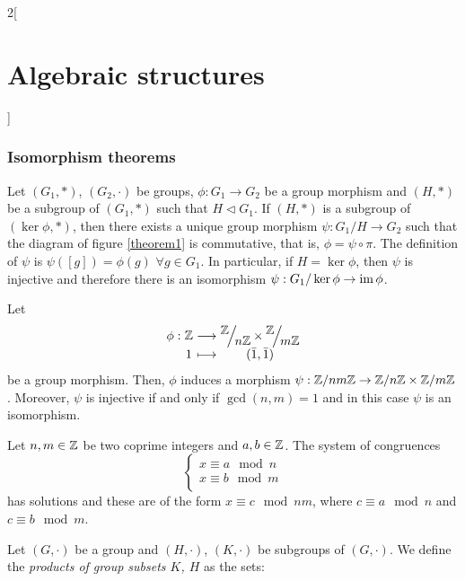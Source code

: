 \documentclass[../../../main.tex]{subfiles}
\begin{document}
\begin{multicols}{2}[\section{Algebraic structures}]
\subsubsection{Isomorphism theorems}
\begin{theorem}
    Let $(G_1,*)$, $(G_2,\cdot)$ be groups, $\phi:G_1\rightarrow G_2$ be a group morphism and $(H,*)$ be a subgroup of $(G_1,*)$ such that $H\lhd G_1$. If $(H,*)$ is a subgroup of $(\ker\phi,*)$, then there exists a unique group morphism $\psi:G_1/H\rightarrow G_2$ such that the diagram of figure \ref{theorem1} is commutative, that is, $\phi=\psi\circ\pi$.
    The definition of $\psi$ is $\psi([g])=\phi(g)$ $\forall g\in G_1$.
    In particular, if $H=\ker\phi$, then $\psi$ is injective and therefore there is an isomorphism $\psi:G_1/\ker\phi\rightarrow\operatorname{im}\phi$.
\end{theorem}
\begin{theorem}
    Let
    \begin{equation*}
        \begin{array}{r@{\hspace{0.5\tabcolsep}}c@{\hspace{0.5\tabcolsep}}c@{\hspace{0.5\tabcolsep}}c}
            \phi:&\ZZ &\longrightarrow&\displaystyle\quot{\ZZ }{n\ZZ }\times\quot{\ZZ }{m\ZZ }\\
            &1&\longmapsto&(\Bar{1},\Bar{1})
        \end{array}
    \end{equation*}
    be a group morphism. Then, $\phi$ induces a morphism $\psi:\mathbb{Z} /nm\mathbb{Z} \rightarrow\mathbb{Z} /n\mathbb{Z} \times\mathbb{Z} /m\mathbb{Z} $. Moreover, $\psi$ is injective if and only if $\gcd(n,m)=1$ and in this case $\psi$ is an isomorphism. 
\end{theorem}
\begin{corollary}
    Let $n,m\in\mathbb{Z} $ be two coprime integers and $a,b\in\mathbb{Z} $. The system of congruences $$\left\{\begin{array}{l}
        x\equiv a\mod{n}  \\
        x\equiv b\mod{m}  \\
    \end{array}\right.$$ has solutions and these are of the form $x\equiv c\mod{nm}$, where $c\equiv a\mod{n}$ and $c\equiv b\mod{m}$.
\end{corollary}
\begin{definition}
    Let $(G,\cdot)$ be a group and $(H,\cdot)$, $(K,\cdot)$ be subgroups of $(G,\cdot)$. We define the \textit{products of group subsets $K$, $H$} as the sets:

\end{definition}
\end{multicols}
\end{document}
